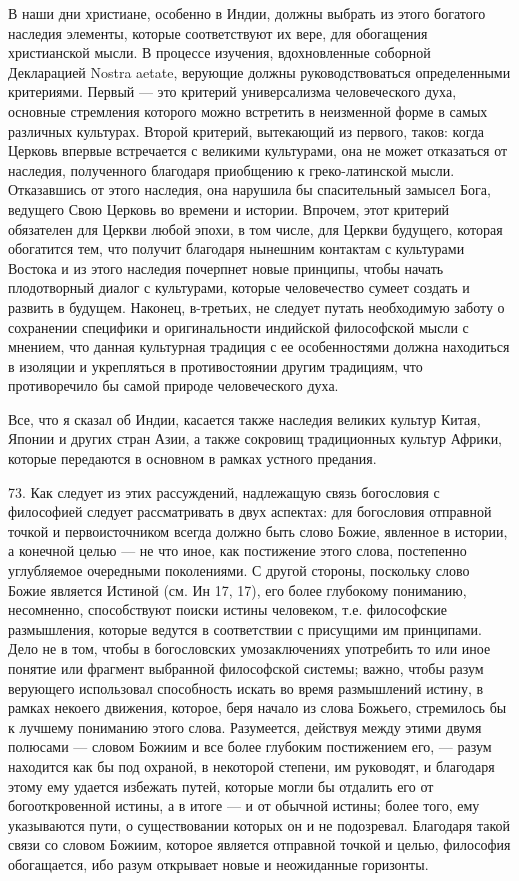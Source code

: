 \documentclass[a5paper,10pt]{article}
\begin{document}
В наши дни христиане, особенно в Индии, должны выбрать из этого богатого
наследия элементы, которые соответствуют их вере, для обогащения христианской
мысли. В процессе изучения, вдохновленные соборной Декларацией Nostra aetate,
верующие должны руководствоваться определенными критериями. Первый — это
критерий универсализма человеческого духа, основные стремления которого можно
встретить в неизменной форме в самых различных культурах. Второй критерий,
вытекающий из первого, таков: когда Церковь впервые встречается с великими
культурами, она не может отказаться от наследия, полученного благодаря
приобщению к греко-латинской мысли. Отказавшись от этого наследия, она нарушила
бы спасительный замысел Бога, ведущего Свою Церковь во времени и истории.
Впрочем, этот критерий обязателен для Церкви любой эпохи, в том числе, для
Церкви будущего, которая обогатится тем, что получит благодаря нынешним
контактам с культурами Востока и из этого наследия почерпнет новые принципы,
чтобы начать плодотворный диалог с культурами, которые человечество сумеет
создать и развить в будущем. Наконец, в-третьих, не следует путать необходимую
заботу о сохранении специфики и оригинальности индийской философской мысли с
мнением, что данная культурная традиция с ее особенностями должна находиться в
изоляции и укрепляться в противостоянии другим традициям, что противоречило бы
самой природе человеческого духа.

Все, что я сказал об Индии, касается также наследия великих культур Китая,
Японии и других стран Азии, а также сокровищ традиционных культур Африки,
которые передаются в основном в рамках устного предания.

73. Как следует из этих рассуждений, надлежащую связь богословия с философией
следует рассматривать в двух аспектах: для богословия отправной точкой и
первоисточником всегда должно быть слово Божие, явленное в истории, а конечной
целью — не что иное, как постижение этого слова, постепенно углубляемое
очередными поколениями. С другой стороны, поскольку слово Божие является
Истиной (см. Ин 17, 17), его более глубокому пониманию, несомненно,
способствуют поиски истины человеком, т.е. философские размышления, которые
ведутся в соответствии с присущими им принципами. Дело не в том, чтобы в
богословских умозаключениях употребить то или иное понятие или фрагмент
выбранной философской системы; важно, чтобы разум верующего использовал
способность искать во время размышлений истину, в рамках некоего движения,
которое, беря начало из слова Божьего, стремилось бы к лучшему пониманию этого
слова. Разумеется, действуя между этими двумя полюсами — словом Божиим и все
более глубоким постижением его, — разум находится как бы под охраной, в
некоторой степени, им руководят, и благодаря этому ему удается избежать путей,
которые могли бы отдалить его от богооткровенной истины, а в итоге — и от
обычной истины; более того, ему указываются пути, о существовании которых он и
не подозревал. Благодаря такой связи со словом Божиим, которое является
отправной точкой и целью, философия обогащается, ибо разум открывает новые и
неожиданные горизонты.
\end{document}
